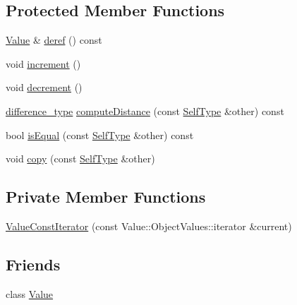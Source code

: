 \subsection*{Protected Member Functions}
\begin{DoxyCompactItemize}
\item 
\hyperlink{classJson_1_1Value}{Value} \& \hyperlink{classJson_1_1ValueIteratorBase_a40a20c65abc423a26e3aae68d9a0525c}{deref} () const 
\item 
void \hyperlink{classJson_1_1ValueIteratorBase_afe58f9534e1fd2033419fd9fe244551e}{increment} ()
\item 
void \hyperlink{classJson_1_1ValueIteratorBase_affc8cf5ff54a9f432cc693362c153fa6}{decrement} ()
\item 
\hyperlink{classJson_1_1ValueIteratorBase_a4e44bf8cbd17ec8d6e2c185904a15ebd}{difference\+\_\+type} \hyperlink{classJson_1_1ValueIteratorBase_ad6c553b249e89e3dc9933e100ccbe064}{compute\+Distance} (const \hyperlink{classJson_1_1ValueIteratorBase_a9d2a940d03ea06d20d972f41a89149ee}{Self\+Type} \&other) const 
\item 
bool \hyperlink{classJson_1_1ValueIteratorBase_a21820d6ee564e541bd118b21e4741962}{is\+Equal} (const \hyperlink{classJson_1_1ValueIteratorBase_a9d2a940d03ea06d20d972f41a89149ee}{Self\+Type} \&other) const 
\item 
void \hyperlink{classJson_1_1ValueIteratorBase_a496e6aba44808433ec5858c178be5719}{copy} (const \hyperlink{classJson_1_1ValueIteratorBase_a9d2a940d03ea06d20d972f41a89149ee}{Self\+Type} \&other)
\end{DoxyCompactItemize}
\subsection*{Private Member Functions}
\begin{DoxyCompactItemize}
\item 
\hyperlink{classJson_1_1ValueConstIterator_aa0a87edf5f1097f91dca5f2a389c4abd}{Value\+Const\+Iterator} (const Value\+::\+Object\+Values\+::iterator \&current)
\end{DoxyCompactItemize}
\subsection*{Friends}
\begin{DoxyCompactItemize}
\item 
class \hyperlink{classJson_1_1ValueConstIterator_aeceedf6e1a7d48a588516ce2b1983d6f}{Value}
\end{DoxyCompactItemize}


